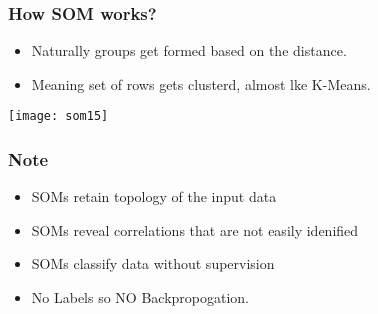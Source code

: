 \begin{frame}[fragile] \frametitle{How SOM works?}
\begin{itemize}
\item Naturally groups get formed based on the distance.
\item Meaning set of rows gets clusterd, almost lke K-Means.
\end{itemize}
\begin{center}
\texttt{[image: som15]}
\end{center}
\end{frame}

\begin{frame}[fragile] \frametitle{Note}
\begin{itemize}
\item SOMs retain topology of the input data
\item SOMs reveal correlations that are not easily idenified
\item SOMs classify data without supervision
\item No Labels so NO Backpropogation.
\end{itemize}

\end{frame}